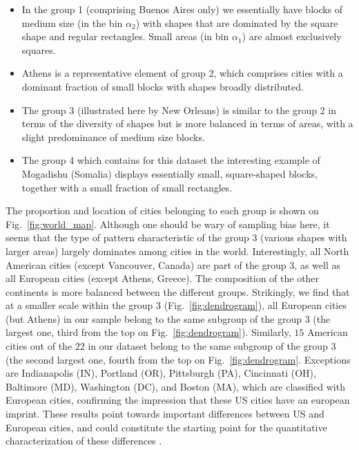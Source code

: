 \begin{itemize} 
    \item{} In the group 1 (comprising
        Buenos Aires only) we essentially have blocks of medium size (in
        the bin $\alpha_2$) with shapes that are dominated by the square
        shape and regular rectangles. Small areas (in bin $\alpha_1$)
        are almost exclusively squares.  \item{} Athens is a
        representative element of group 2, which comprises cities with a
        dominant fraction of small blocks with shapes broadly distributed.
    \item{} The group 3 (illustrated here by New Orleans) is similar to the
        group 2 in terms of the diversity of shapes but is more balanced in
        terms of areas, with a slight predominance of medium size blocks.
    \item{} The group 4 which contains for this dataset the interesting
        example of Mogadishu (Somalia) displays essentially small,
        square-shaped blocks, together with a small fraction of small
        rectangles.  
\end{itemize}

The proportion and location of cities belonging to each group is shown on
Fig.~\ref{fig:world_map}. Although one should be wary of sampling bias here, it
seems that the type of pattern characteristic of the group $3$ (various shapes
with larger areas) largely dominates among cities in the world. Interestingly,
all North American cities (except Vancouver, Canada) are part of the group $3$,
as well as all European cities (except Athens, Greece). The composition of the
other continents is more balanced between the different groups. Strikingly, we
find that at a smaller scale within the group $3$ (Fig.~\ref{fig:dendrogram}),
all European cities (but Athens) in our sample belong to the same subgroup of
the group $3$ (the largest one, third from the top on
Fig.~\ref{fig:dendrogram}). Similarly, $15$ American cities out of the $22$ in
our dataset belong to the same subgroup of the group $3$ (the second largest
one, fourth from the top on Fig.~\ref{fig:dendrogram}. Exceptions are
Indianapolis (IN), Portland (OR), Pittsburgh (PA), Cincinnati (OH), Baltimore
(MD), Washington (DC), and Boston (MA), which are classified with European
cities, confirming the impression that these US cities have an european imprint.
These results point towards important differences between US and European
cities, and could constitute the starting point for the quantitative
characterization of these differences \cite{Bretagnolle:2010}.



